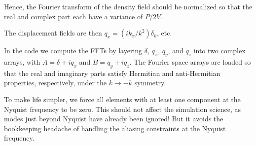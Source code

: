 \documentclass[11pt,preprint]{aastex}
\begin{document}
Hence, the Fourier transform of the density field should be normalized
so that the real and complex part each have a variance of $P/2V$.

The displacement fields are then $q_x = (ik_x/k^2) \delta_k$, etc.

In the code we compute the FFTs by layering $\delta$, $q_x$, $q_y$,
and $q_z$ into two complex arrays, with $A = \delta + iq_x$ and $B
= q_y+iq_z$.  The Fourier space arrays are loaded so that the real
and imaginary parts satisfy Hermitian and anti-Hermitian properties,
respectively, under the $k\rightarrow -k$ symmetry.

To make life simpler, we force all elements with at least one
component at the Nyquist frequency to be zero.  This should not
affect the simulation science, as modes just beyond Nyquist have
already been ignored!  But it avoids the bookkeeping headache of
handling the aliasing constraints at the Nyquist frequency.
\end{document}
